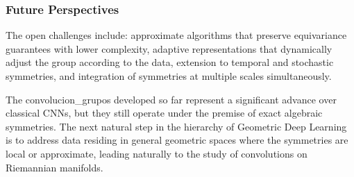 \subsubsection{Future Perspectives}\label{subsubsec:perspectivas_desarrollo_futuro}

The open challenges include: approximate algorithms that preserve equivariance guarantees with lower complexity, adaptive representations that dynamically adjust the group according to the data, extension to temporal and stochastic symmetries, and integration of symmetries at multiple scales simultaneously.

The \glspl{convolucion_grupo} developed so far represent a significant advance over classical CNNs, but they still operate under the premise of exact algebraic symmetries. The next natural step in the hierarchy of Geometric Deep Learning is to address data residing in general geometric spaces where the symmetries are local or approximate, leading naturally to the study of convolutions on Riemannian manifolds.

